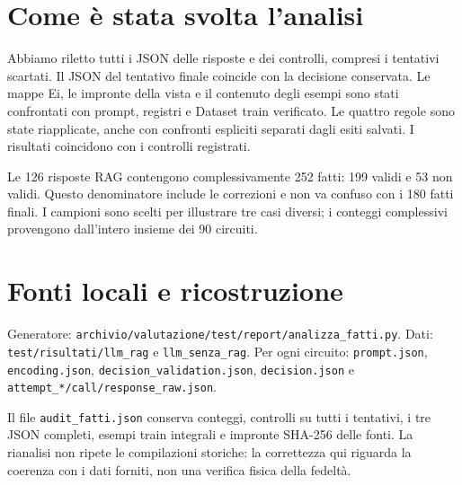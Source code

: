 \documentclass[a4paper,10pt]{article}
\begin{document}
\section*{Come è stata svolta l'analisi}
Abbiamo riletto tutti i JSON delle risposte e dei controlli, compresi i tentativi scartati. Il JSON del tentativo finale coincide con la decisione conservata. Le mappe Ei, le impronte della vista e il contenuto degli esempi sono stati confrontati con prompt, registri e Dataset train verificato. Le quattro regole sono state riapplicate, anche con confronti espliciti separati dagli esiti salvati. I risultati coincidono con i controlli registrati.\par
Le 126 risposte RAG contengono complessivamente 252 fatti: 199 validi e 53 non validi. Questo denominatore include le correzioni e non va confuso con i 180 fatti finali. I campioni sono scelti per illustrare tre casi diversi; i conteggi complessivi provengono dall'intero insieme dei 90 circuiti.\par
\section*{Fonti locali e ricostruzione}
{\small\raggedright Generatore: \texttt{archivio/valutazione/test/report/analizza\_fatti.py}. Dati: \texttt{test/risultati/llm\_rag} e \texttt{llm\_senza\_rag}. Per ogni circuito: \texttt{prompt.json}, \texttt{encoding.json}, \texttt{decision\_validation.json}, \texttt{decision.json} e \texttt{attempt\_*/call/response\_raw.json}.\par}
Il file \texttt{audit\_fatti.json} conserva conteggi, controlli su tutti i tentativi, i tre JSON completi, esempi train integrali e impronte SHA-256 delle fonti. La rianalisi non ripete le compilazioni storiche: la correttezza qui riguarda la coerenza con i dati forniti, non una verifica fisica della fedeltà.\par
\end{document}
